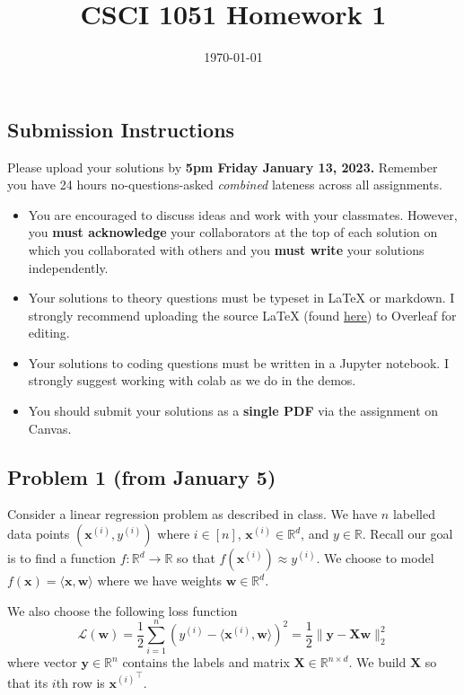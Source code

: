 \documentclass{article}
\title{CSCI 1051 Homework 1}
\author{} %
\date{\today}
\begin{document}
\maketitle

\subsection*{Submission Instructions}

Please upload your solutions by
\textbf{5pm Friday January 13, 2023.}
Remember you have 24 hours no-questions-asked
\textit{combined} lateness across all assignments.
\begin{itemize}
\item You are encouraged to discuss ideas
and work with your classmates. However, you
\textbf{must acknowledge} your collaborators
at the top of each solution on which
you collaborated with others 
and you \textbf{must write} your solutions
independently.
\item Your solutions to theory questions must
be typeset in LaTeX or markdown.
I strongly recommend uploading the source LaTeX (found 
\href{https://www.rtealwitter.com/deeplearning2023/files/homework1.tex}{here})
to Overleaf for editing.
\item Your solutions to coding questions must
be written in a Jupyter notebook.
I strongly suggest working with colab as
we do in the demos.
\item You should submit your solutions as a
\textbf{single PDF} via the assignment on Canvas.
\end{itemize}

\subsection*{Problem 1 (from January 5)}

Consider a linear regression problem as described in class.
We have $n$ labelled data points
$(\mathbf{x}^{(i)}, y^{(i)})$ where $i \in [n]$,
$\mathbf{x}^{(i)} \in \mathbb{R}^d$, and $y \in \mathbb{R}$.
Recall our goal is to find a function 
$f: \mathbb{R}^d \rightarrow \mathbb{R}$
so that $f(\mathbf{x}^{(i)}) \approx y^{(i)}$.
We choose to model 
$f(\mathbf{x}) = \langle \mathbf{x}, \mathbf{w} \rangle$
where we have weights $\mathbf{w} \in \mathbb{R}^d$.

We also choose the following loss function
\begin{equation*}
 \mathcal{L}(\mathbf{w}) 
= \frac{1}{2} \sum_{i=1}^n (y^{(i)} -
\langle \mathbf{x}^{(i)}, \mathbf{w} \rangle)^2
= \frac{1}{2} \| \mathbf{y} - \mathbf{X} \mathbf{w} \|_2^2   
\end{equation*}
where vector $\mathbf{y} \in \mathbb{R}^n$ contains the labels
and matrix $\mathbf{X} \in \mathbb{R}^{n \times d}$.
We build $\mathbf{X}$ so that its $i$th row is
${\mathbf{x}^{(i)}}^\top$.
\end{document}
